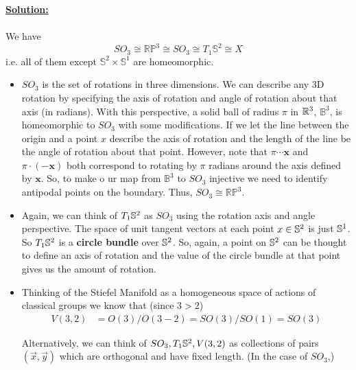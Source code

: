 \documentclass[11pt]{article}
\begin{document}
\vskip 0.5cm
\textbf{\underline{Solution:}}
\\
\\
We have 
\[ SO_3 \cong \mathbb{RP}^3 \cong SO_3 \cong T_1 \mathbb{S}^2 \cong X \] i.e. all of them except $\mathbb{S}^2 \times \mathbb{S}^1$ are homeomorphic.
\\
\begin{itemize}
  \item $SO_3$ is the set of rotations in three dimensions. We can describe any 3D rotation by specifying the axis of rotation and angle of rotation about that axis (in radians). With this perspective, a solid ball of radius $\pi$ in $\mathbb{R}^3$, $\mathbb{B}^3$, is homeomorphic to $SO_3$ with some modifications. If we let the line between the origin and a point $x$ describe the axis of rotation and the length of the line be the angle of rotation about that point. However, note that $\pi \cdots \mathbf{x}$ and $\pi \cdot (-\mathbf{x})$ both correspond to rotating by $\pi$ radians around the axis defined by $\mathbf{x}$. So, to make o ur map from $\mathbb{B}^3$ to $SO_3$ injective we need to identify antipodal points on the boundary. Thus, $SO_3 \cong \mathbb{RP}^3$.
  
  \item Again, we can think of $T_1 \mathbb{S}^2$ as $SO_3$ using the rotation axis and angle perspective. The space of unit tangent vectors at each point $x \in \mathbb{S}^2$ is just $\mathbb{S}^1$. So $T_1 \mathbb{S}^2$ is a \textbf{circle bundle} over $\mathbb{S}^2$. So, again, a point on $\mathbb{S}^2$ can be thought to define an axis of rotation and the value of the circle bundle at that point gives us the amount of rotation.  
  


  \item Thinking of the Stiefel Manifold as a homogeneous space of actions of classical groups we know that (since $3 > 2$) 
  \begin{align*}
    V(3,2) &= O(3)/O(3-2) = SO(3)/SO(1) = SO(3)
  \end{align*}

  Alternatively, we can think of $SO_3, T_1 \mathbb{S}^2, V(3,2)$ as collections of pairs $(\vec{x}, \vec{y})$ which are orthogonal and have fixed length. (In the case of $SO_3$,) 
  

\end{itemize}
\end{document}
